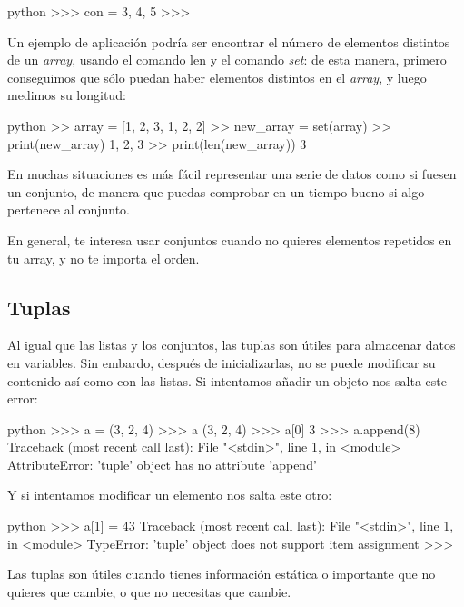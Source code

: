 \documentclass{article}
\begin{document}
\begin{mintedbox}{python}
>>> con = {3, 4, 5}
>>> 

\end{mintedbox}
Un ejemplo de aplicación podría ser encontrar el número de elementos distintos de un \textit{array}, usando el comando len y el comando \textit{set}: de esta manera, primero conseguimos que sólo puedan haber elementos distintos en el \textit{array}, y luego medimos su longitud:

\begin{mintedbox}{python}
>> array = [1, 2, 3, 1, 2, 2]
>> new_array = set(array)
>> print(new_array)
{1, 2, 3}
>> print(len(new_array))
3
\end{mintedbox}

En muchas situaciones es más fácil representar una serie de datos como si fuesen un conjunto, de manera que puedas comprobar en un tiempo bueno si algo pertenece al conjunto.


En general, te interesa usar conjuntos cuando no quieres elementos repetidos en tu array, y no te importa el orden.

\subsection{Tuplas}

Al igual que las listas y los conjuntos, las tuplas son útiles para almacenar datos en variables. Sin embardo, después de inicializarlas, no se puede modificar su contenido así como con las listas. Si intentamos añadir un objeto nos salta este error:

\begin{mintedbox}{python}
>>> a = (3, 2, 4)
>>> a
(3, 2, 4)
>>> a[0]
3
>>> a.append(8)
Traceback (most recent call last):
  File "<stdin>", line 1, in <module>
AttributeError: 'tuple' object has no attribute 'append'


\end{mintedbox}
Y si intentamos modificar un elemento nos salta este otro:
\begin{mintedbox}{python}
>>> a[1] = 43
Traceback (most recent call last):
  File "<stdin>", line 1, in <module>
TypeError: 'tuple' object does not support item assignment
>>> 


\end{mintedbox}
Las tuplas son útiles cuando tienes información estática o importante que no quieres que cambie, o que no necesitas que cambie. 
\end{document}
